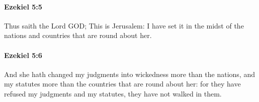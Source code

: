 		\paragraph{Ezekiel 5:5} %
			\label{EZEKIEL-5-5}

			Thus saith the Lord GOD; This is Jerusalem: I have set it in the midst of the nations and countries that are round about her.


		\paragraph{Ezekiel 5:6} %
			\label{EZEKIEL-5-6}

			And she hath changed my judgments into wickedness more than the nations, and my statutes more than the countries that are round about her: for they have refused my judgments and my statutes, they have not walked in them.


